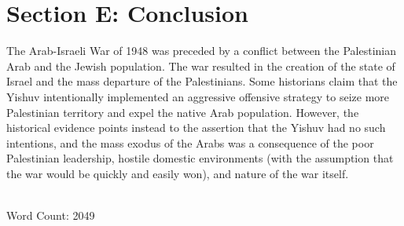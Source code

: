 \documentclass[11pt]{turabian-researchpaper}
\begin{document}

\section{Section E: Conclusion}
The Arab-Israeli War of 1948 was preceded by a conflict between the Palestinian Arab and the Jewish population.  The war resulted in the creation of the state of Israel and the mass departure of the Palestinians.  Some historians claim that the Yishuv intentionally implemented an aggressive offensive strategy to seize more Palestinian territory and expel the native Arab population.  However, the historical evidence points instead to the assertion that the Yishuv had no such intentions, and the mass exodus of the Arabs was a consequence of the poor Palestinian leadership, hostile domestic environments (with the assumption that the war would be quickly and easily won), and nature of the war itself.

~\\

Word Count: 2049

\printbibliography[title=Section F: Bibliography]{}
\end{document}
